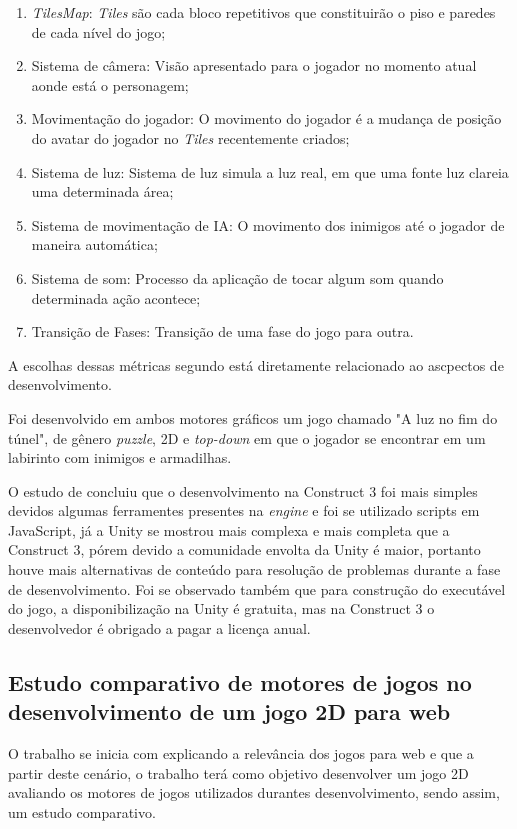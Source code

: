\begin{enumerate}
	\item \textit{TilesMap}: \textit{Tiles} são cada bloco repetitivos que constituirão o piso e paredes de cada nível do jogo;
	\item Sistema de câmera: Visão apresentado para o jogador no momento atual aonde está o personagem;
	\item Movimentação do jogador: O movimento do jogador é a mudança de posição do avatar do jogador no \textit{Tiles} recentemente criados;
	\item Sistema de luz: Sistema de luz simula a luz real, em que uma fonte luz clareia uma determinada área;
	\item Sistema de movimentação de IA: O movimento dos inimigos até o jogador de maneira automática;
	\item Sistema de som: Processo da aplicação de tocar algum som quando determinada ação acontece;
	\item Transição de Fases: Transição de uma fase do jogo para outra.
\end{enumerate}

A escolhas dessas métricas segundo \cite{Alves2020} está diretamente relacionado ao ascpectos de desenvolvimento.

Foi desenvolvido em ambos motores gráficos um jogo chamado "A luz no fim do túnel", de gênero \textit{puzzle}, 2D e \textit{top-down}
em que o jogador se encontrar em um labirinto com inimigos e armadilhas.

O estudo de \cite{Alves2020} concluiu que o desenvolvimento na Construct 3 
foi mais simples devidos algumas ferramentes presentes na \textit{engine} e foi se utilizado scripts em JavaScript, 
já a Unity se mostrou mais complexa e mais completa que a Construct 3, pórem devido a comunidade envolta da Unity é maior,
portanto houve  mais alternativas de conteúdo para resolução de problemas durante a fase de desenvolvimento.
Foi se observado também que para construção do executável do jogo, a disponibilização na Unity é gratuita, mas na Construct 3 o desenvolvedor
é obrigado a pagar a licença anual.

\subsection{Estudo comparativo de motores de jogos no desenvolvimento de um jogo 2D para web}

O trabalho se inicia com \cite{pantoja2022jogos} explicando a relevância dos jogos para web e que a partir deste cenário, 
o trabalho terá como objetivo desenvolver um jogo 2D avaliando os motores de jogos utilizados durantes desenvolvimento, sendo assim, um estudo comparativo.

